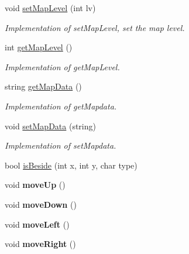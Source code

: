 \begin{DoxyCompactItemize}
void \hyperlink{classMap_a837120a90bc4341c9557c1d7d6246fd7}{set\+Map\+Level} (int lv)
\begin{DoxyCompactList}\small\item\em Implementation of set\+Map\+Level, set the map level. \end{DoxyCompactList}\item 
\hypertarget{classMap_add2e9cc8e6b3654669625f6650c99d34}{}\label{classMap_add2e9cc8e6b3654669625f6650c99d34} 
int \hyperlink{classMap_add2e9cc8e6b3654669625f6650c99d34}{get\+Map\+Level} ()
\begin{DoxyCompactList}\small\item\em Implementation of get\+Map\+Level. \end{DoxyCompactList}\item 
\hypertarget{classMap_ae37a3b0439938533d8b2286fcb0f57da}{}\label{classMap_ae37a3b0439938533d8b2286fcb0f57da} 
string \hyperlink{classMap_ae37a3b0439938533d8b2286fcb0f57da}{get\+Map\+Data} ()
\begin{DoxyCompactList}\small\item\em Implementation of get\+Mapdata. \end{DoxyCompactList}\item 
\hypertarget{classMap_a94074365bf7aaa7aef44607581f47f3e}{}\label{classMap_a94074365bf7aaa7aef44607581f47f3e} 
void \hyperlink{classMap_a94074365bf7aaa7aef44607581f47f3e}{set\+Map\+Data} (string)
\begin{DoxyCompactList}\small\item\em Implementation of set\+Mapdata. \end{DoxyCompactList}\item 
bool \hyperlink{classMap_a7ba2837b589493924b726dc326d68e8e}{is\+Beside} (int x, int y, char type)
\item 
\hypertarget{classMap_ad207fb29d08bb739b8d9dbbf1c9f34c3}{}\label{classMap_ad207fb29d08bb739b8d9dbbf1c9f34c3} 
void {\bfseries move\+Up} ()
\item 
\hypertarget{classMap_a204b87a86f8ea07c3476a4131468435e}{}\label{classMap_a204b87a86f8ea07c3476a4131468435e} 
void {\bfseries move\+Down} ()
\item 
\hypertarget{classMap_a55174d49b53a214018de7c082851266a}{}\label{classMap_a55174d49b53a214018de7c082851266a} 
void {\bfseries move\+Left} ()
\item 
\hypertarget{classMap_a503c30d06e3720519fac7c9045f2eea2}{}\label{classMap_a503c30d06e3720519fac7c9045f2eea2} 
void {\bfseries move\+Right} ()
\item 

\end{DoxyCompactItemize}

